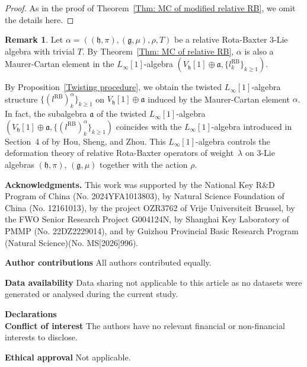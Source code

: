 \documentclass[12pt]{amsart}
\theoremstyle{definition}
\newtheorem{remark}[theorem]{Remark}
\begin{document}
\begin{proof}
	As in the proof of Theorem~\ref{Thm: MC of modified relative RB}, we omit the details here.
\end{proof}

\begin{remark}
	Let $\alpha=\left( \left(\mathfrak{h},\pi\right),\left(\mathfrak{g},\mu\right),\rho, T\right)$ be a relative Rota-Baxter $3$-Lie algebra with trivial $T$. By Theorem~\ref{Thm: MC of relative RB}, $\alpha$ is also a Maurer-Cartan element in the $L_\infty[1]$-algebra $(V_{\mathfrak{h}}[1] \oplus \mathfrak{a}, \{l^{\mathrm{RB}}_k\}_{k\geq 1})$.
	
	By Proposition~\ref{Twisting procedure}, we obtain the twisted $L_\infty[1]$-algebra structure $\{(l^{\mathrm{RB}})^{\alpha}_k\}_{k\geq 1}$ on $V_{\mathfrak{h}}[1] \oplus \mathfrak{a}$ induced by the Maurer-Cartan element $\alpha$. In fact, the subalgebra $\mathfrak{a}$ of the twisted $L_\infty[1]$-algebra $(V_{\mathfrak{h}}[1] \oplus \mathfrak{a}, \{(l^{\mathrm{RB}})^{\alpha}_k\}_{k\geq 1})$ coincides with the $L_\infty[1]$-algebra introduced in Section~4 of \cite{HSZ23} by Hou, Sheng, and Zhou. This $L_\infty[1]$-algebra controls the deformation theory of relative Rota-Baxter operators of weight~$\lambda$ on $3$-Lie algebras $\left(\mathfrak{h},\pi\right)$, $\left(\mathfrak{g},\mu\right)$ together with the action $\rho$.
	
\end{remark}



\bigskip
\noindent
{\bf Acknowledgments.} This work  was   supported by  the National Key R$\&$D Program of China (No. 2024YFA1013803), by Natural Science Foundation of China (No. 12161013),      by the project OZR3762 of Vrije Universiteit Brussel, by the FWO Senior Research Project G004124N,    by Shanghai Key Laboratory of PMMP (No. 22DZ2229014), and by Guizhou Provincial Basic Research Program (Natural Science)(No. MS[2026]996). 

\noindent
\textbf{Author contributions}
All authors contributed equally.

\noindent
{ \bf Data availability} Data sharing not applicable to this article as no datasets were
generated or analysed during the current study.


\noindent
{ \bf Declarations}  \\
{ \bf Conflict of interest}  The authors have no relevant financial or non-financial
interests to disclose.

\noindent
\textbf{Ethical approval}  Not applicable.
\end{document}
